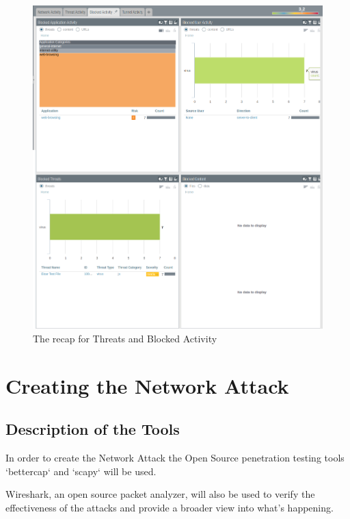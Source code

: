\begin{figure}[h!]
 \centering
 \includegraphics[width=13.8cm]{img/acc.png}
 \caption{The  recap for Threats and Blocked Activity}
 \label{fig: acc}
\end{figure}


\newpage

\chapter{Creating the Network Attack}

\section{Description of the Tools}

In order to create the Network Attack the Open Source penetration testing tools `bettercap`\cite{bettercap} and `scapy`\cite{scapy} will be used.

Wireshark\cite{wireshark}, an open source packet analyzer, will also be used to verify the effectiveness of the attacks and provide a broader view into what's happening.

